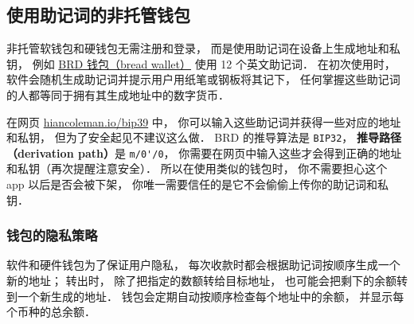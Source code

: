 \subsection{使用助记词的非托管钱包}
非托管软钱包和硬钱包无需注册和登录， 而是使用助记词在设备上生成地址和私钥， 例如 \href{https://brd.com/}{BRD 钱包（bread wallet）} 使用 12 个英文助记词． 在初次使用时， 软件会随机生成助记词并提示用户用纸笔或钢板将其记下， 任何掌握这些助记词的人都等同于拥有其生成地址中的数字货币．

在网页 \href{https://iancoleman.io/bip39/}{hiancoleman.io/bip39} 中， 你可以输入这些助记词并获得一些对应的地址和私钥， 但为了安全起见不建议这么做． BRD 的推导算法是 \verb|BIP32|， \textbf{推导路径（derivation path）}是 \verb|m/0'/0|， 你需要在网页中输入这些才会得到正确的地址和私钥（再次提醒注意安全）． 所以在使用类似的钱包时， 你不需要担心这个 app 以后是否会被下架， 你唯一需要信任的是它不会偷偷上传你的助记词和私钥．

\subsubsection{钱包的隐私策略}
软件和硬件钱包为了保证用户隐私， 每次收款时都会根据助记词按顺序生成一个新的地址； 转出时， 除了把指定的数额转给目标地址， 也可能会把剩下的余额转到一个新生成的地址． 钱包会定期自动按顺序检查每个地址中的余额， 并显示每个币种的总余额．
